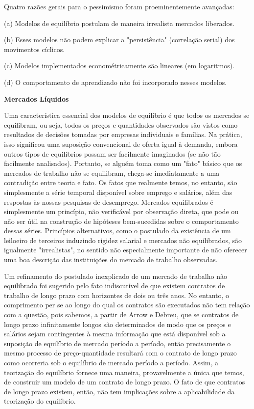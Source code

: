 \documentclass[a4paper,12pt]{article}[abntex2]
\begin{document}
Quatro razões gerais para o pessimismo foram proeminentemente avançadas:

(a) Modelos de equilíbrio postulam de maneira irrealista mercados liberados.

(b) Esses modelos não podem explicar a "persistência" (correlação serial) dos movimentos cíclicos.

(c) Modelos implementados econométricamente são lineares (em logaritmos).

(d) O comportamento de aprendizado não foi incorporado nesses modelos.

\textbf{Mercados Líquidos}

Uma característica essencial dos modelos de equilíbrio é que todos os mercados se equilibram, ou seja, todos os preços e quantidades observados são vistos como resultados de decisões tomadas por empresas individuais e famílias. Na prática, isso significou uma suposição convencional de oferta igual à demanda, embora outros tipos de equilíbrios possam ser facilmente imaginados (se não tão facilmente analisados). Portanto, se alguém toma como um "fato" básico que os mercados de trabalho não se equilibram, chega-se imediatamente a uma contradição entre teoria e fato. Os fatos que realmente temos, no entanto, são simplesmente a série temporal disponível sobre emprego e salários, além das respostas às nossas pesquisas de desemprego. Mercados equilibrados é simplesmente um princípio, não verificável por observação direta, que pode ou não ser útil na construção de hipóteses bem-sucedidas sobre o comportamento dessas séries. Princípios alternativos, como o postulado da existência de um leiloeiro de terceiros induzindo rigidez salarial e mercados não equilibrados, são igualmente "irrealistas", no sentido não especialmente importante de não oferecer uma boa descrição das instituições do mercado de trabalho observadas.

Um refinamento do postulado inexplicado de um mercado de trabalho não equilibrado foi sugerido pelo fato indiscutível de que existem contratos de trabalho de longo prazo com horizontes de dois ou três anos. No entanto, o comprimento per se ao longo do qual os contratos são executados não tem relação com a questão, pois sabemos, a partir de Arrow e Debreu, que se contratos de longo prazo infinitamente longos são determinados de modo que os preços e salários sejam contingentes à mesma informação que está disponível sob a suposição de equilíbrio de mercado período a período, então precisamente o mesmo processo de preço-quantidade resultará com o contrato de longo prazo como ocorreria sob o equilíbrio de mercado período a período. Assim, a teorização do equilíbrio fornece uma maneira, provavelmente a única que temos, de construir um modelo de um contrato de longo prazo. O fato de que contratos de longo prazo existem, então, não tem implicações sobre a aplicabilidade da teorização do equilíbrio.
\end{document}
